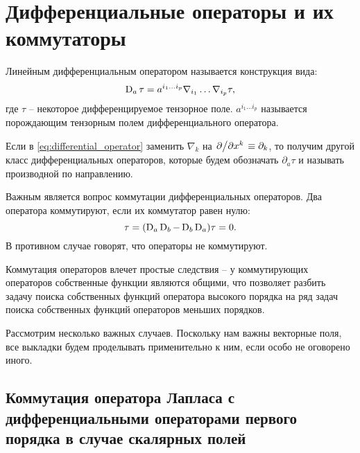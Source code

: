 \documentclass[12pt,a4paper]{article}
\begin{document}

    \section{Дифференциальные операторы и их коммутаторы\label{sec:commutators}}

        Линейным дифференциальным оператором называется конструкция вида:
        \begin{equation}\label{eq:differential_operator}
            \operatorname{D}_a\tau = a^{i_1 \dots i_p} \nabla_{i_1} \dots \nabla_{i_p} \tau ,
        \end{equation}
        где $\tau$ -- некоторое дифференцируемое тензорное поле. $a^{i_1 \dots i_p}$ называется порождающим тензорным полем дифференциального оператора.

        Если в \autoref{eq:differential_operator} заменить $\nabla_k$ на $\pdv*{x^k} \equiv \partial_k$, то получим другой класс дифференциальных операторов, которые будем обозначать $\partial_a\tau$ и называть производной по направлению.

        Важным является вопрос коммутации дифференциальных операторов. Два оператора коммутируют, если их коммутатор равен нулю:
        \begin{equation}
            [\D_a, \D_b]\tau = (\D_a \D_b - \D_b \D_a) \tau = 0 .
        \end{equation}
        В противном случае говорят, что операторы не коммутируют.

        Коммутация операторов влечет простые следствия -- у коммутирующих операторов собственные функции являются общими, что позволяет разбить задачу поиска собственных функций оператора высокого порядка на ряд задач поиска собственных функций операторов меньших порядков.

        Рассмотрим несколько важных случаев. Поскольку нам важны векторные поля, все выкладки будем проделывать применительно к ним, если особо не оговорено иного.

        \subsection{Коммутация оператора Лапласа с дифференциальными операторами первого порядка в случае скалярных полей}
\end{document}
